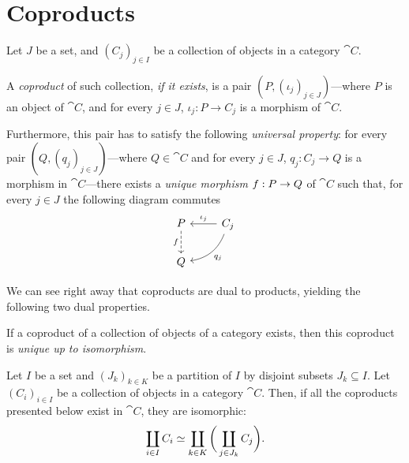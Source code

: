\section{Coproducts}

\begin{definition}[Coproduct]
    \label{def:coproduct}
    Let \(J\) be a set, and \((C_j)_{j \in I}\) be a
    collection of objects in a category \(\cat C\).

    A \emph{coproduct} of such collection, \emph{if it exists}, is a pair
    \((P, (\iota_j)_{j \in J})\)---where \(P\) is an object of \(\cat C\), and for
    every \(j \in J\), \(\iota_j: P \to C_j\) is a morphism of \(\cat C\).

    Furthermore, this pair has to satisfy the following \emph{universal property}:
    for every pair \((Q, (q_j)_{j \in J})\)---where \(Q \in \cat C\) and for every
    \(j \in J\), \(q_j: C_j \to Q\) is a morphism in \(\cat C\)---there exists a
    \emph{unique morphism} \(f: P \to Q\) of \(\cat C\) such that, for every
    \(j \in J\) the following diagram commutes
    \[
        \begin{tikzcd}
            P \ar[d, dashed, "f"']
            &C_j \ar[l, "\iota_j"'] \ar[ld, bend left, "q_j"] \\
            Q &
        \end{tikzcd}
    \]
\end{definition}

We can see right away that coproducts are dual to products, yielding the
following two dual properties.

\begin{proposition}[Uniqueness]
    \label{prop:coproduct-unique-up-to-iso}
    If a coproduct of a collection of objects of a category exists, then this
    coproduct is \emph{unique up to isomorphism}.
\end{proposition}

\begin{proposition}
    \label{prop:coproduct-ordering-independent}
    Let \(I\) be a set and \((J_k)_{k \in K}\) be a partition of \(I\) by disjoint
    subsets \(J_k \subseteq I\). Let \((C_i)_{i \in I}\) be a collection of objects
    in a category \(\cat C\). Then, if all the coproducts presented below exist in
    \(\cat C\), they are isomorphic:
    \[
        \coprod_{i \in I} C_i \simeq \coprod_{k \in K} \bigg(\coprod_{j \in J_k} C_j \bigg).
    \]
\end{proposition}

